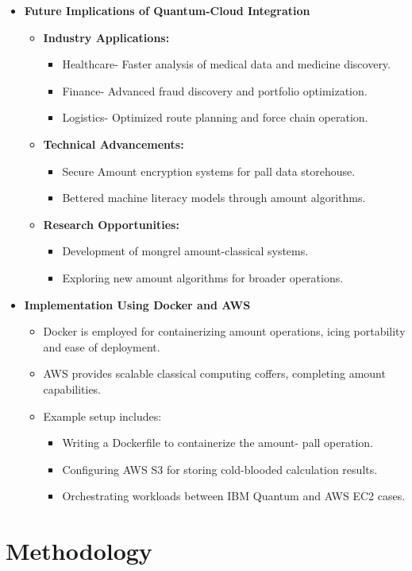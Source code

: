 \documentclass[12pt,a4paper]{article}
\begin{document}
\begin{itemize}
    \item \textbf{Future Implications of Quantum-Cloud Integration}
    \begin{itemize}
        \item \textbf{Industry Applications:}
        \begin{itemize}
            \item Healthcare- Faster analysis of medical data and medicine discovery.
             \item  Finance- Advanced fraud discovery and portfolio optimization.
             \item Logistics- Optimized route planning and force chain operation.
        \end{itemize}
        \item \textbf{Technical Advancements:}
        \begin{itemize}
            \item Secure Amount encryption systems for pall data storehouse.
             \item Bettered machine literacy models through amount algorithms.
        \end{itemize}
        \item \textbf{Research Opportunities:}
        \begin{itemize}
            \item Development of mongrel amount-classical systems.
            \item Exploring new amount algorithms for broader operations.
        \end{itemize}
    \end{itemize}
\newpage
    \item \textbf{Implementation Using Docker and AWS}
    \begin{itemize}
        \item Docker is employed for containerizing amount operations, icing portability and ease of deployment.
         \item AWS provides scalable classical computing coffers, completing amount capabilities.
        \item Example setup includes:
        \begin{itemize}
            \item Writing a{ Dockerfile} to containerize the amount- pall operation.
             \item Configuring AWS S3 for storing cold-blooded calculation results.
             \item Orchestrating workloads between IBM Quantum and AWS EC2 cases.
        \end{itemize}
    \end{itemize}

\end{itemize}
\newpage
\begin{center}
    \fontsize{14}{16}\selectfont \bfseries
    \section{Methodology}
\end{center}
\end{document}
